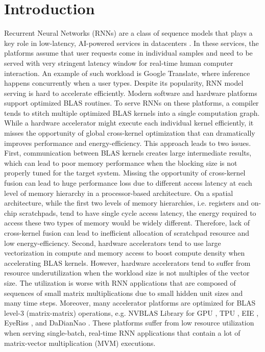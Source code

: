
\section{Introduction}
\label{sec:intro}

Recurrent Neural Networks (RNNs) are a class of sequence models that plays a key role
  in low-latency,
  AI-powered services in datacenters \cite{fowers2018configurable, jouppi2017datacenter}.
In these services,
  the platforms assume that user requests come in individual samples
  and need to be served with very stringent latency window
  for real-time human computer interaction.
  An example of such workload is
  Google Translate, where inference happens concurrently when a user types.
Despite its popularity, RNN model serving is hard to accelerate efficiently.
Modern software and hardware platforms support optimized BLAS routines.
To serve RNNs on these platforms,
  a compiler tends to stitch multiple optimized BLAS kernels into a single computation graph.
While a hardware accelerator might execute each individual kernel efficiently,
it misses the opportunity of global cross-kernel optimization that can dramatically
improves performance and energy-efficiency.
This approach leads to two issues.
First, communication between BLAS kernels creates large intermediate results, which can
lead to poor memory performance when the blocking size is not properly tuned for the target
system.
Missing the opportunity of cross-kernel fusion can lead to huge performance loss
due to different access latency at each level of memory hierarchy in a processor-based
architecture. On a spatial architecture, while the first two levels of memory hierarchies,
  i.e. registers and on-chip scratchpads,
  tend to have single cycle access latency,
  the energy required to access these two types of memory would be widely different.
Therefore, lack of cross-kernel fusion can lead to inefficient allocation of
scratchpad resource and low energy-efficiency.
Second, hardware accelerators tend to use large vectorization in
compute and memory access to boost compute density
when accelerating BLAS kernels. However, hardware accelerators tend to suffer from resource
underutilization when the workload size is not multiples of the vector size.
The utilization is worse with RNN applications that are composed of sequences of small matrix
  multiplications due to small hidden unit sizes and many time steps.
Moreover, many accelerator platforms are optimized for BLAS level-3 (matrix-matrix) operations, e.g. NVBLAS Library for GPU \cite{nvblas}, TPU \cite{jouppi2017datacenter}, EIE \cite{han2016eie}, EyeRiss \cite{chen2017eyeriss}, and DaDianNao \cite{chen2014dadiannao}.
These platforms suffer from low resource utilization when serving single-batch,
  real-time RNN applications
  that contain a lot of matrix-vector multiplication (MVM) executions.

